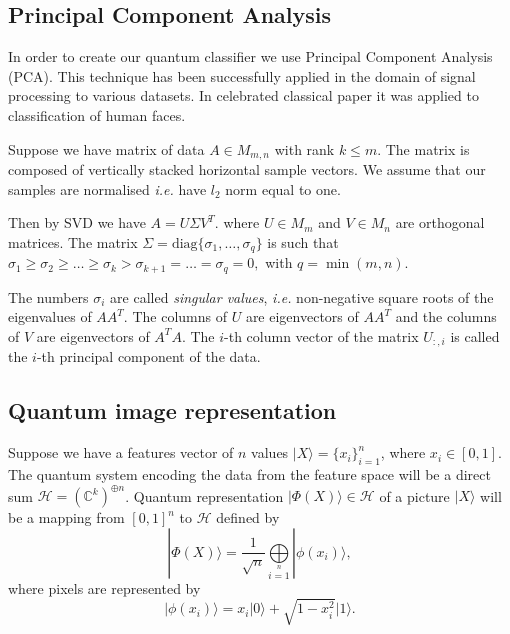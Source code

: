 \documentclass[a4paper,10pt]{llncs}
\newcommand{\ket}[1]{| #1 \rangle}
\newcommand{\1}{\mathbb{1}}
\begin{document}
\subsection{Principal Component Analysis}
In order to create our quantum classifier we use Principal Component Analysis (PCA). This technique has been
successfully applied in the domain of signal processing to various datasets. In celebrated classical paper \cite{turk1991face} it was applied to classification of human faces.

Suppose we have matrix of data $A\in M_{m,n}$ with rank $k\leq m$. The matrix is
composed of vertically stacked horizontal sample vectors. We assume that our
samples are normalised \textit{i.e.} have $l_2$ norm equal to one.

Then by SVD we have
$
A=U\Sigma V^T.
$
where $U\in M_m$ and $V\in M_n$ are orthogonal matrices. 
The matrix $\Sigma = \mathrm{diag}\{\sigma_1,\ldots ,\sigma_q\}$ is such that
$
\sigma_{1}\geq\sigma_{2}\geq \ldots \geq\sigma_{k}>\sigma_{k+1}
= \ldots = \sigma_{q} = 0,
$
with $q=\min(m,n)$.

The numbers $\sigma_{i}$ are called \emph{singular values},
\textit{i.e.} non-negative square roots of the eigenvalues of $AA^T$. The columns of $U$
are eigenvectors of $AA^T$ and the columns of $V$ are eigenvectors of $A^T A$.
The $i$-th column vector of the matrix $U_{:,i}$ is called the $i$-th principal
component of the data.


\subsection{Quantum image representation}


 
Suppose we have a features vector of $n$ values
$\ket{X}=\{x_i\}_{i=1}^n$, where $x_i\in [0,1]$. The quantum system encoding 
the 
data from the feature space will be a direct sum 
$\mathcal{H}=(\mathbb{C}^k)^{\oplus n}$. Quantum 
representation $\ket{\Phi(X)}\in\mathcal{H}$ of a picture $\ket{X}$ will be a 
mapping from $[0,1]^n$ to $\mathcal{H}$ defined by
\begin{equation} 
\ket{\Phi(X)}=\frac{1}{\sqrt{n}}\bigoplus\limits_{i=1}\limits^n 
\ket{\phi(x_i)},
\label{eq:image_representation}
\end{equation}
where pixels are represented by
\begin{equation}
\ket{\phi (x_i)}=x_i\ket{0}+\sqrt{1-x_i^2}\ket{1}.
\end{equation}
\end{document}
